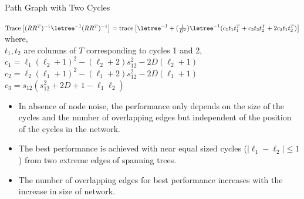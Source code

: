 \begin{frame}{Path Graph with Two Cycles}
	
	\begin{block}{}
		$\text{Trace}\left[(RR^T)^{-1}\letree^{-1}(RR^T)^{-1}\right]=\text{trace}\left[\letree^{-1}+(\frac{1}{D^2})\letree^{-1}(c_1t_1t_1^T+c_2t_2t_2^T+2c_3t_1t_2^T)\right]$\\
		where, \\
		$t_1,t_2$ are columns of $T$ corresponding to cycles 1 and 2,\\
		$c_1=\ell_1(\ell_2+1)^2-(\ell_2+2)s_{12}^2-2D(\ell_2+1)$\\
		$c_2=\ell_2(\ell_1+1)^2-(\ell_1+2)s_{12}^2-2D(\ell_1+1)$\\
		$c_3=s_{12}(s_{12}^2+2D+1-\ell_1\ell_2)$
	\end{block}
	\begin{alertblock}{}
	\begin{itemize}
		\item In absence of node noise, the performance only depends on the size of the cycles and the number of overlapping edges but independent of the position of the cycles in the network.
		\item The best performance is achieved with near equal sized cycles ($|\ell_1-\ell_2|\le1$) from two extreme edges of spanning trees.
		\item The number of overlapping edges for best performance increases with the increase in size of network.
	\end{itemize}
\end{alertblock}

\end{frame}
